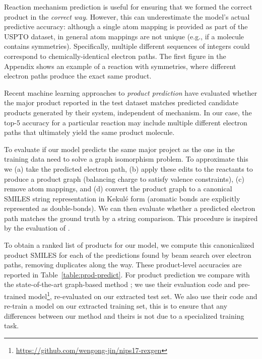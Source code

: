 Reaction mechanism prediction is useful for ensuring that we formed the correct product in the {\em correct way}.
However, this can underestimate the model's actual predictive accuracy: although a single atom mapping is provided as part of the USPTO dataset, in general atom mappings are not unique (e.g., if a molecule contains symmetries). Specifically, multiple different sequences of integers could correspond to chemically-identical electron paths. 
The first figure in the Appendix shows an example of a reaction with symmetries, where different electron paths produce the exact same product. 

Recent machine learning approaches to {\em product prediction} \citep{jin2017predicting,schwaller2017found}
have evaluated whether the major product reported in the test dataset matches predicted candidate products generated by their system, independent of mechanism.
In our case, the top-5 accuracy for a particular reaction may include multiple different electron paths that ultimately yield the same product molecule.

To evaluate if our model predicts the same major project as the one in the training data need to solve a graph isomorphism problem. To approximate this 
we (a) take the predicted electron path, 
(b) apply these edits to the reactants to produce a product graph (balancing charge to satisfy valence constraints), 
(c) remove atom mappings,
and (d) convert the product graph to a canonical SMILES string representation in Kekul\'e form (aromatic bonds are explicitly represented as double-bonds). 
We can then evaluate whether a predicted electron path matches the ground truth by a string comparison. This procedure is inspired by the evaluation of \citet{schwaller2017found}.

To obtain a ranked list of products for our model, we compute this canonicalized product SMILES for each of the predictions found by beam search over electron paths, removing duplicates along the way. 
These product-level accuracies are reported in Table~\ref{table:prod-predict}.
For product prediction we compare with the state-of-the-art graph-based method \cite{jin2017predicting};
we use their evaluation code and pre-trained model\footnote{\url{https://github.com/wengong-jin/nips17-rexgen}},
re-evaluated on our extracted test set. 
We also use their code and re-train a model on our extracted training set, this is to ensure that any differences between our method and theirs is not due to a specialized training task.

